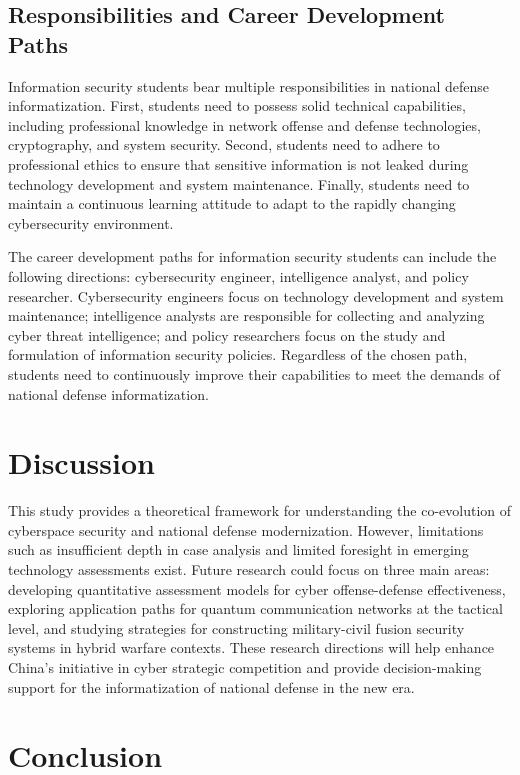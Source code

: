 \documentclass[12pt, a4paper]{article}
\begin{document}
\subsection{Responsibilities and Career Development Paths}

Information security students bear multiple responsibilities in national defense informatization. First, students need to possess solid technical capabilities, including professional knowledge in network offense and defense technologies, cryptography, and system security. Second, students need to adhere to professional ethics to ensure that sensitive information is not leaked during technology development and system maintenance. Finally, students need to maintain a continuous learning attitude to adapt to the rapidly changing cybersecurity environment.

The career development paths for information security students can include the following directions: cybersecurity engineer, intelligence analyst, and policy researcher. Cybersecurity engineers focus on technology development and system maintenance; intelligence analysts are responsible for collecting and analyzing cyber threat intelligence; and policy researchers focus on the study and formulation of information security policies. Regardless of the chosen path, students need to continuously improve their capabilities to meet the demands of national defense informatization.

\section{Discussion}\label{sec:discussion}

This study provides a theoretical framework for understanding the co-evolution of cyberspace security and national defense modernization. However, limitations such as insufficient depth in case analysis and limited foresight in emerging technology assessments exist. Future research could focus on three main areas: developing quantitative assessment models for cyber offense-defense effectiveness, exploring application paths for quantum communication networks at the tactical level, and studying strategies for constructing military-civil fusion security systems in hybrid warfare contexts. These research directions will help enhance China's initiative in cyber strategic competition and provide decision-making support for the informatization of national defense in the new era.

\section{Conclusion}\label{sec:conclusion}
\end{document}
